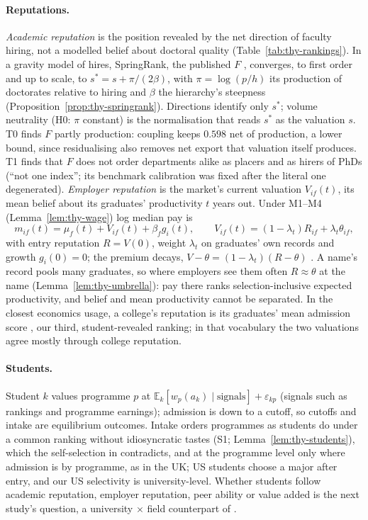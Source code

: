 \paragraph{Reputations.} \emph{Academic reputation} is the position revealed by the net direction of faculty hiring,
not a modelled belief about doctoral quality (Table~\ref{tab:thy-rankings}). In a gravity model of hires, SpringRank, the published $F$
\citep{wapman2022quantifying,debacco2018physical}, converges, to first order and up to scale, to $s^*=s+\pi/(2\beta)$, with $\pi=\log(p/h)$ its
production of doctorates relative to hiring and $\beta$ the hierarchy's steepness
(Proposition~\ref{prop:thy-springrank}). Directions identify only $s^*$; volume neutrality (H0: $\pi$ constant) is
the normalisation that reads $s^*$ as the valuation $s$. T0 finds $F$ partly production: coupling keeps $0.598$
 net of production, a lower bound, since residualising also removes net export that valuation
itself produces. T1 finds that $F$ does not order departments alike as placers and as hirers of PhDs (``not one
index''; its benchmark calibration was fixed after the literal one degenerated). \emph{Employer reputation} is the market's current valuation
$V_{if}(t)$, its mean belief about its graduates' productivity $t$ years out. Under
M1--M4 (Lemma~\ref{lem:thy-wage}) log median pay is
\begin{equation}\label{eq:thy-wage}
m_{if}(t)=\mu_f(t)+V_{if}(t)+\beta_fg_i(t),\qquad V_{if}(t)=(1-\lambda_t)R_{if}+\lambda_t\theta_{if},
\end{equation}
with entry reputation $R=V(0)$, weight $\lambda_t$ on graduates' own records and growth $g_i(0)=0$; the premium
decays, $V-\theta=(1-\lambda_t)(R-\theta)$ \citep{farber1996learning}. A name's record pools many graduates, so where
employers see them often $R\approx\theta$ at the name (Lemma~\ref{lem:thy-umbrella}): pay there ranks
selection-inclusive expected productivity, and belief and mean productivity cannot be separated. In the
closest economics usage, a college's reputation is its graduates' mean admission score \citep{macleod2017big}, our
third, student-revealed ranking; in that vocabulary the two valuations agree mostly through college reputation.

\paragraph{Students.} Student $k$ values programme $p$ at $\mathbb E_k[w_p(a_k)\mid\text{signals}]+\varepsilon_{kp}$
(signals such as rankings and programme earnings); admission is down to a cutoff, so cutoffs and
intake are equilibrium outcomes. Intake orders programmes as students do under a common ranking without idiosyncratic
tastes (S1; Lemma~\ref{lem:thy-students}), which the self-selection in \citet{kirkeboen2016field} contradicts,
and at the programme level only where admission is by programme, as in the UK; US students choose a major after entry, and our
US selectivity is university-level. Whether students follow academic reputation, employer reputation, peer ability
or value added is the next study's question, a university $\times$ field counterpart of
\citet{abdulkadiroglu2020parents}.


